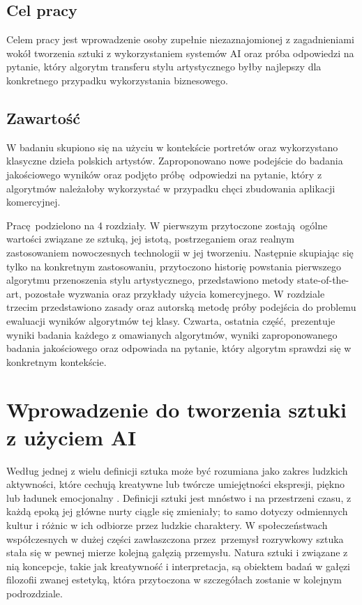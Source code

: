 \documentclass[12pt]{article}
\begin{document}
{}
\subsection*{Cel pracy}

\indent

Celem pracy jest wprowadzenie osoby zupełnie niezaznajomionej z zagadnieniami wokół tworzenia sztuki z wykorzystaniem systemów AI oraz próba odpowiedzi na pytanie, który algorytm transferu stylu artystycznego byłby najlepszy dla konkretnego przypadku wykorzystania biznesowego.



\subsection*{Zawartość}

\indent

W badaniu skupiono się na użyciu w kontekście portretów oraz wykorzystano klasyczne dzieła polskich artystów. Zaproponowano nowe podejście do badania jakościowego wyników oraz podjęto próbę odpowiedzi na pytanie, który z algorytmów należałoby wykorzystać w przypadku chęci zbudowania aplikacji komercyjnej.

Pracę podzielono na 4 rozdziały. W pierwszym przytoczone zostają ogólne wartości związane ze sztuką, jej istotą, postrzeganiem oraz realnym zastosowaniem nowoczesnych technologii w jej tworzeniu. Następnie skupiając się tylko na konkretnym zastosowaniu, przytoczono historię powstania pierwszego algorytmu przenoszenia stylu artystycznego, przedstawiono metody state-of-the-art, pozostałe wyzwania oraz przykłady użycia komercyjnego. W rozdziale trzecim przedstawiono zasady oraz autorską metodę próby podejścia do problemu ewaluacji wyników algorytmów tej klasy. Czwarta, ostatnia część, prezentuje wyniki badania każdego z omawianych algorytmów, wyniki zaproponowanego badania jakościowego oraz odpowiada na pytanie, który algorytm sprawdzi się w konkretnym kontekście.

\newpage

\section{Wprowadzenie do tworzenia sztuki z użyciem AI}

\indent

Według jednej z wielu definicji sztuka może być rozumiana jako zakres ludzkich aktywności, które cechują kreatywne lub twórcze umiejętności ekspresji, piękno lub ładunek emocjonalny \cite{11,12,13}. Definicji sztuki jest mnóstwo i na przestrzeni czasu, z każdą epoką jej główne nurty ciągle się zmieniały; to samo dotyczy odmiennych kultur i różnic w ich odbiorze przez ludzkie charaktery. W społeczeństwach współczesnych w dużej części zawłaszczona przez przemysł rozrywkowy sztuka stała się w pewnej mierze kolejną gałęzią przemysłu. Natura sztuki i związane z nią koncepcje, takie jak kreatywność i interpretacja, są obiektem badań w gałęzi filozofii zwanej estetyką, która przytoczona w szczegółach zostanie w kolejnym podrozdziale.
\end{document}
